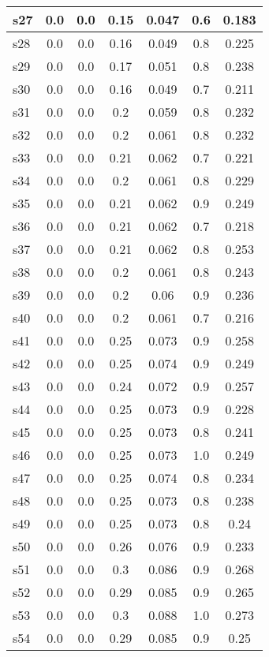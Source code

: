 \documentclass{article}
\begin{document}
\begin{tabular}{|l|c|c|c|c|c|c|}
\hline
s27 &0.0 & 0.0 & 0.15 & 0.047 & 0.6 & 0.183\\
\hline
s28 &0.0 & 0.0 & 0.16 & 0.049 & 0.8 & 0.225\\
\hline
s29 &0.0 & 0.0 & 0.17 & 0.051 & 0.8 & 0.238\\
\hline
s30 &0.0 & 0.0 & 0.16 & 0.049 & 0.7 & 0.211\\
\hline
s31 &0.0 & 0.0 & 0.2 & 0.059 & 0.8 & 0.232\\
\hline
s32 &0.0 & 0.0 & 0.2 & 0.061 & 0.8 & 0.232\\
\hline
s33 &0.0 & 0.0 & 0.21 & 0.062 & 0.7 & 0.221\\
\hline
s34 &0.0 & 0.0 & 0.2 & 0.061 & 0.8 & 0.229\\
\hline
s35 &0.0 & 0.0 & 0.21 & 0.062 & 0.9 & 0.249\\
\hline
s36 &0.0 & 0.0 & 0.21 & 0.062 & 0.7 & 0.218\\
\hline
s37 &0.0 & 0.0 & 0.21 & 0.062 & 0.8 & 0.253\\
\hline
s38 &0.0 & 0.0 & 0.2 & 0.061 & 0.8 & 0.243\\
\hline
s39 &0.0 & 0.0 & 0.2 & 0.06 & 0.9 & 0.236\\
\hline
s40 &0.0 & 0.0 & 0.2 & 0.061 & 0.7 & 0.216\\
\hline
s41 &0.0 & 0.0 & 0.25 & 0.073 & 0.9 & 0.258\\
\hline
s42 &0.0 & 0.0 & 0.25 & 0.074 & 0.9 & 0.249\\
\hline
s43 &0.0 & 0.0 & 0.24 & 0.072 & 0.9 & 0.257\\
\hline
s44 &0.0 & 0.0 & 0.25 & 0.073 & 0.9 & 0.228\\
\hline
s45 &0.0 & 0.0 & 0.25 & 0.073 & 0.8 & 0.241\\
\hline
s46 &0.0 & 0.0 & 0.25 & 0.073 & 1.0 & 0.249\\
\hline
s47 &0.0 & 0.0 & 0.25 & 0.074 & 0.8 & 0.234\\
\hline
s48 &0.0 & 0.0 & 0.25 & 0.073 & 0.8 & 0.238\\
\hline
s49 &0.0 & 0.0 & 0.25 & 0.073 & 0.8 & 0.24\\
\hline
s50 &0.0 & 0.0 & 0.26 & 0.076 & 0.9 & 0.233\\
\hline
s51 &0.0 & 0.0 & 0.3 & 0.086 & 0.9 & 0.268\\
\hline
s52 &0.0 & 0.0 & 0.29 & 0.085 & 0.9 & 0.265\\
\hline
s53 &0.0 & 0.0 & 0.3 & 0.088 & 1.0 & 0.273\\
\hline
s54 &0.0 & 0.0 & 0.29 & 0.085 & 0.9 & 0.25\\
\hline

\end{tabular}
\end{document}
